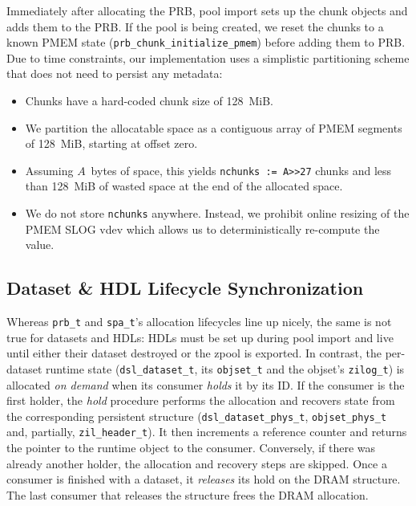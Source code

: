 \documentclass[12pt,a4paper,twoside]{book}
\begin{document}
Immediately after allocating the PRB, pool import sets up the chunk objects and adds them to the PRB.
If the pool is being created, we reset the chunks to a known PMEM state (\lstinline{prb_chunk_initialize_pmem}) before adding them to PRB.
Due to time constraints, our implementation uses a simplistic partitioning scheme that does not need to persist any metadata:
\begin{itemize}[noitemsep]
    \item Chunks have a hard-coded chunk size of \SI{128}{MiB}.
    \item We partition the allocatable space as a contiguous array of PMEM segments of \SI{128}{MiB}, starting at offset zero.
    \item Assuming $A$~bytes of space, this yields \lstinline{nchunks := A>>27} chunks and less than \SI{128}{MiB} of wasted space at the end of the allocated space.
    \item We do not store \lstinline{nchunks} anywhere. Instead, we prohibit online resizing of the PMEM SLOG vdev which allows us to deterministically re-compute the value.
\end{itemize}

\subsection{Dataset \& HDL Lifecycle Synchronization}\label{sec:zilpmem:hdllifecycle}
Whereas \lstinline{prb_t} and \lstinline{spa_t}'s allocation lifecycles line up nicely, the same is not true for datasets and HDLs:
HDLs must be set up during pool import and live until either their dataset destroyed or the zpool is exported.
In contrast, the per-dataset runtime state (\lstinline{dsl_dataset_t}, its \lstinline{objset_t} and the objset's \lstinline{zilog_t}) is allocated \textit{on demand} when its consumer \textit{holds} it by its ID.
If the consumer is the first holder, the \textit{hold} procedure performs the allocation and recovers state from the corresponding persistent structure (\lstinline{dsl_dataset_phys_t}, \lstinline{objset_phys_t} and, partially, \lstinline{zil_header_t}).
It then increments a reference counter and returns the pointer to the runtime object to the consumer.
Conversely, if there was already another holder, the allocation and recovery steps are skipped.
Once a consumer is finished with a dataset, it \textit{releases} its hold on the DRAM structure.
The last consumer that releases the structure frees the DRAM allocation.
\end{document}

